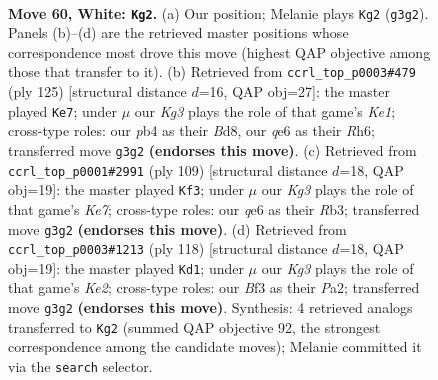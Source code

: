 \documentclass[11pt]{article}
\begin{document}
\clearpage

\begin{figure}[p]\centering
\begin{subfigure}{0.46\textwidth}\centering
\resizebox{\linewidth}{!}{%
\newchessgame
\chessboard[
  setfen={8/8/4q3/8/Rp1k4/b4BK1/8/8 w - - 10 60},
  showmover=false,
  pgfstyle=straightmove, color=movearrow, markmove={g3-g2}
]}
\caption{}
\end{subfigure}\hfill
\begin{subfigure}{0.46\textwidth}\centering
\resizebox{\linewidth}{!}{%
\newchessgame
\chessboard[
  setfen={R2bk3/8/7r/8/4K1B1/7P/8/8 b - - 12 63},
  showmover=false,
  pgfstyle=straightmove, color=movearrow, markmove={e8-e7}
]}
\caption{}
\end{subfigure}
\\[4pt]
\begin{subfigure}{0.46\textwidth}\centering
\resizebox{\linewidth}{!}{%
\newchessgame
\chessboard[
  setfen={8/8/1P6/2B1K3/8/1r6/4k1bR/8 b - - 14 55},
  showmover=false,
  pgfstyle=straightmove, color=movearrow, markmove={e2-f3}
]}
\caption{}
\end{subfigure}\hfill
\begin{subfigure}{0.46\textwidth}\centering
\resizebox{\linewidth}{!}{%
\newchessgame
\chessboard[
  setfen={8/p7/8/3k4/3b4/3R4/P3K3/8 w - - 9 60},
  showmover=false,
  pgfstyle=straightmove, color=movearrow, markmove={e2-d1}
]}
\caption{}
\end{subfigure}
\caption{\textbf{Move 60, White: \texttt{Kg2}.} (a) Our position; Melanie plays \texttt{Kg2} (\texttt{g3g2}). Panels (b)--(d) are the retrieved master positions whose correspondence most drove this move (highest QAP objective among those that transfer to it). (b) Retrieved from \texttt{ccrl\_top\_p0003\#479} (ply 125) [structural distance $d$=16, QAP obj=27]: the master played \texttt{Ke7}; under $\mu$ our \emph{Kg3} plays the role of that game's \emph{Ke1}; cross-type roles: our \emph{p}b4 as their \emph{B}d8, our \emph{q}e6 as their \emph{R}h6; transferred move \texttt{g3g2} \textbf{(endorses this move)}. (c) Retrieved from \texttt{ccrl\_top\_p0001\#2991} (ply 109) [structural distance $d$=18, QAP obj=19]: the master played \texttt{Kf3}; under $\mu$ our \emph{Kg3} plays the role of that game's \emph{Ke7}; cross-type roles: our \emph{q}e6 as their \emph{R}b3; transferred move \texttt{g3g2} \textbf{(endorses this move)}. (d) Retrieved from \texttt{ccrl\_top\_p0003\#1213} (ply 118) [structural distance $d$=18, QAP obj=19]: the master played \texttt{Kd1}; under $\mu$ our \emph{Kg3} plays the role of that game's \emph{Ke2}; cross-type roles: our \emph{B}f3 as their \emph{P}a2; transferred move \texttt{g3g2} \textbf{(endorses this move)}. Synthesis: 4 retrieved analogs transferred to \texttt{Kg2} (summed QAP objective 92, the strongest correspondence among the candidate moves); Melanie committed it via the \texttt{search} selector.}
\label{fig:thought-m118}
\end{figure}
\end{document}
